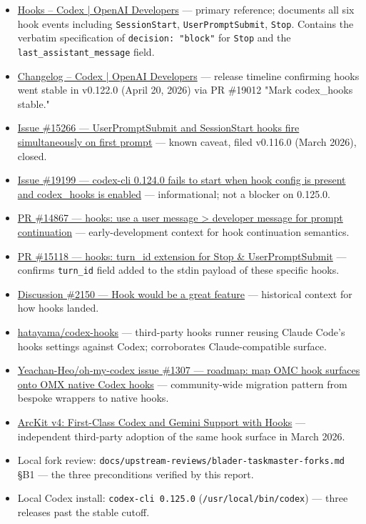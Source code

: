 \documentclass[twocolumn,10pt,letterpaper]{article}
\begin{document}
\begin{itemize}
\setlength{\itemsep}{0pt}
\setlength{\parskip}{0pt}
  \item \href{https://developers.openai.com/codex/hooks}{Hooks – Codex | OpenAI Developers} — primary reference; documents all six hook events including \texttt{SessionStart}, \texttt{UserPromptSubmit}, \texttt{Stop}. Contains the verbatim specification of \texttt{decision: "block"} for \texttt{Stop} and the \texttt{last\_assistant\_message} field.
  \item \href{https://developers.openai.com/codex/changelog}{Changelog – Codex | OpenAI Developers} — release timeline confirming hooks went stable in v0.122.0 (April 20, 2026) via PR \#19012 "Mark codex\_hooks stable."
  \item \href{https://github.com/openai/codex/issues/15266}{Issue \#15266 — UserPromptSubmit and SessionStart hooks fire simultaneously on first prompt} — known caveat, filed v0.116.0 (March 2026), closed.
  \item \href{https://github.com/openai/codex/issues/19199}{Issue \#19199 — codex-cli 0.124.0 fails to start when hook config is present and codex\_hooks is enabled} — informational; not a blocker on 0.125.0.
  \item \href{https://github.com/openai/codex/pull/14867}{PR \#14867 — hooks: use a user message > developer message for prompt continuation} — early-development context for hook continuation semantics.
  \item \href{https://github.com/openai/codex/pull/15118}{PR \#15118 — hooks: turn\_id extension for Stop \& UserPromptSubmit} — confirms \texttt{turn\_id} field added to the stdin payload of these specific hooks.
  \item \href{https://github.com/openai/codex/discussions/2150}{Discussion \#2150 — Hook would be a great feature} — historical context for how hooks landed.
  \item \href{https://github.com/hatayama/codex-hooks}{hatayama/codex-hooks} — third-party hooks runner reusing Claude Code's hooks settings against Codex; corroborates Claude-compatible surface.
  \item \href{https://github.com/Yeachan-Heo/oh-my-codex/issues/1307}{Yeachan-Heo/oh-my-codex issue \#1307 — roadmap: map OMC hook surfaces onto OMX native Codex hooks} — community-wide migration pattern from bespoke wrappers to native hooks.
  \item \href{https://medium.com/arckit/arckit-v4-first-class-codex-and-gemini-support-with-hooks-mcp-servers-and-native-policies-abdf9569e00e}{ArcKit v4: First-Class Codex and Gemini Support with Hooks} — independent third-party adoption of the same hook surface in March 2026.
  \item Local fork review: \texttt{docs/\allowbreak upstream-\allowbreak reviews/\allowbreak blader-\allowbreak taskmaster-\allowbreak forks.md} §B1 — the three preconditions verified by this report.
  \item Local Codex install: \texttt{codex-\allowbreak cli 0.125.0} (\texttt{/\allowbreak usr/\allowbreak local/\allowbreak bin/\allowbreak codex}) — three releases past the stable cutoff.
\end{itemize}


\balance
\end{document}
